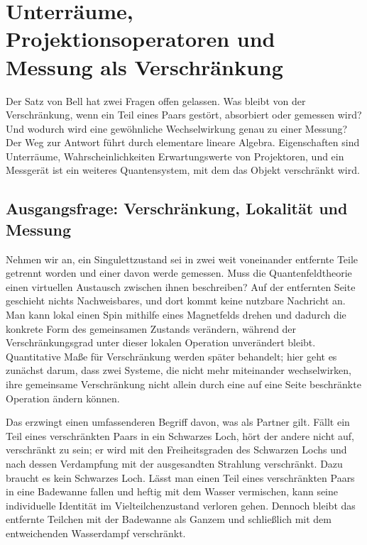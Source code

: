 \chapter{Unterräume, Projektionsoperatoren und Messung als Verschränkung}

Der Satz von Bell hat zwei Fragen offen gelassen. Was bleibt von der Verschränkung, wenn ein Teil eines Paars gestört, absorbiert oder gemessen wird? Und wodurch wird eine gewöhnliche Wechselwirkung genau zu einer Messung? Der Weg zur Antwort führt durch elementare lineare Algebra. Eigenschaften sind Unterräume, Wahrscheinlichkeiten Erwartungswerte von Projektoren, und ein Messgerät ist ein weiteres Quantensystem, mit dem das Objekt verschränkt wird.

\section{Ausgangsfrage: Verschränkung, Lokalität und Messung}

Nehmen wir an, ein Singulettzustand sei in zwei weit voneinander entfernte Teile getrennt worden und einer davon werde gemessen. Muss die Quantenfeldtheorie einen virtuellen Austausch zwischen ihnen beschreiben? Auf der entfernten Seite geschieht nichts Nachweisbares, und dort kommt keine nutzbare Nachricht an. Man kann lokal einen Spin mithilfe eines Magnetfelds drehen und dadurch die konkrete Form des gemeinsamen Zustands verändern, während der Verschränkungsgrad unter dieser lokalen Operation unverändert bleibt. Quantitative Maße für Verschränkung werden später behandelt; hier geht es zunächst darum, dass zwei Systeme, die nicht mehr miteinander wechselwirken, ihre gemeinsame Verschränkung nicht allein durch eine auf eine Seite beschränkte Operation ändern können.

\begin{classroomqa}\end{classroomqa}

Das erzwingt einen umfassenderen Begriff davon, was als Partner gilt. Fällt ein Teil eines verschränkten Paars in ein Schwarzes Loch, hört der andere nicht auf, verschränkt zu sein; er wird mit den Freiheitsgraden des Schwarzen Lochs und nach dessen Verdampfung mit der ausgesandten Strahlung verschränkt. Dazu braucht es kein Schwarzes Loch. Lässt man einen Teil eines verschränkten Paars in eine Badewanne fallen und heftig mit dem Wasser vermischen, kann seine individuelle Identität im Vielteilchenzustand verloren gehen. Dennoch bleibt das entfernte Teilchen mit der Badewanne als Ganzem und schließlich mit dem entweichenden Wasserdampf verschränkt.


